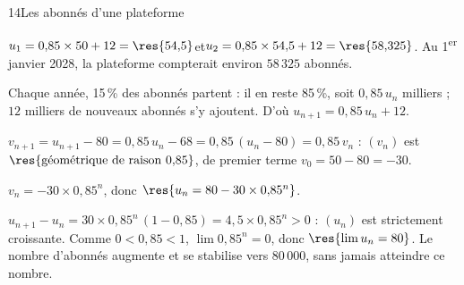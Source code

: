 \begin{corrige}{14}{Les abonnés d'une plateforme}
\begin{questions}
  \item $u_1=0{,}85\times50+12=\res{54{,}5}$\quad et\quad $u_2=0{,}85\times54{,}5+12=\res{58{,}325}$.
    Au 1\textsuperscript{er} janvier 2028, la plateforme compterait environ $58\,325$ abonnés.
  \item Chaque année, 15\,\% des abonnés partent : il en reste 85\,\%, soit $0{,}85\,u_n$ milliers ;
    $12$ milliers de nouveaux abonnés s'y ajoutent. D'où $u_{n+1}=0{,}85\,u_n+12$.
  \item $v_{n+1}=u_{n+1}-80=0{,}85\,u_n-68=0{,}85\,(u_n-80)=0{,}85\,v_n$ : $(v_n)$ est
    $\res{\text{géométrique de raison }0{,}85}$, de premier terme $v_0=50-80=-30$.
  \item $v_n=-30\times0{,}85^{n}$, donc $\res{u_n=80-30\times0{,}85^{n}}$.
  \item $u_{n+1}-u_n=30\times0{,}85^{n}\,(1-0{,}85)=4{,}5\times0{,}85^{n}>0$ : $(u_n)$ est strictement croissante.
    Comme $0<0{,}85<1$, $\lim0{,}85^{n}=0$, donc $\res{\lim u_n=80}$. Le nombre d'abonnés augmente
    et se stabilise vers $80\,000$, sans jamais atteindre ce nombre.
\end{questions}


\end{corrige}
